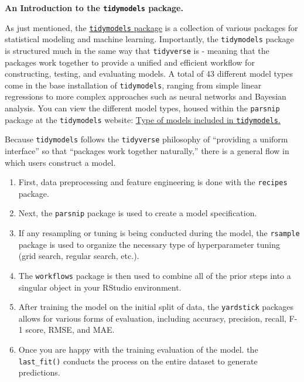 \documentclass[
  letterpaper,
]{krantz}
\providecommand{\tightlist}{%
  \setlength{\itemsep}{0pt}\setlength{\parskip}{0pt}}\usepackage{longtable,booktabs,array}
\begin{document}
\begin{tcolorbox}[enhanced jigsaw, colback=white, leftrule=.75mm, breakable, colframe=quarto-callout-important-color-frame, bottomtitle=1mm, rightrule=.15mm, left=2mm, opacityback=0, bottomrule=.15mm, arc=.35mm, coltitle=black, colbacktitle=quarto-callout-important-color!10!white, toptitle=1mm, titlerule=0mm, title=\textcolor{quarto-callout-important-color}{\faExclamation}\hspace{0.5em}{Important}, toprule=.15mm, opacitybacktitle=0.6]

\textbf{An Introduction to the \texttt{tidymodels} package.}

As just mentioned, the
\href{https://www.tidymodels.org/}{\texttt{tidymodels} package} is a
collection of various packages for statistical modeling and machine
learning. Importantly, the \texttt{tidymodels} package is structured
much in the same way that \texttt{tidyverse} is - meaning that the
packages work together to provide a unified and efficient workflow for
constructing, testing, and evaluating models. A total of 43 different
model types come in the base installation of \texttt{tidymodels},
ranging from simple linear regressions to more complex approaches such
as neural networks and Bayesian analysis. You can view the different
model types, housed within the \texttt{parsnip} package at the
\texttt{tidymodels} website:
\href{https://www.tidymodels.org/find/parsnip/}{Type of models included
in \texttt{tidymodels}.}

Because \texttt{tidymodels} follows the \texttt{tidyverse} philosophy of
``providing a uniform interface'' so that ``packages work together
naturally,'' there is a general flow in which users construct a model.

\begin{enumerate}
\def\labelenumi{\arabic{enumi}.}
\tightlist
\item
  First, data preprocessing and feature engineering is done with the
  \texttt{recipes} package.
\item
  Next, the \texttt{parsnip} package is used to create a model
  specification.
\item
  If any resampling or tuning is being conducted during the model, the
  \texttt{rsample} package is used to organize the necessary type of
  hyperparameter tuning (grid search, regular search, etc.).
\item
  The \texttt{workflows} package is then used to combine all of the
  prior steps into a singular object in your RStudio environment.
\item
  After training the model on the initial split of data, the
  \texttt{yardstick} packages allows for various forms of evaluation,
  including accuracy, precision, recall, F-1 score, RMSE, and MAE.
\item
  Once you are happy with the training evaluation of the model. the
  \texttt{last\_fit()} conducts the process on the entire dataset to
  generate predictions.
\end{enumerate}


\end{tcolorbox}
\end{document}
